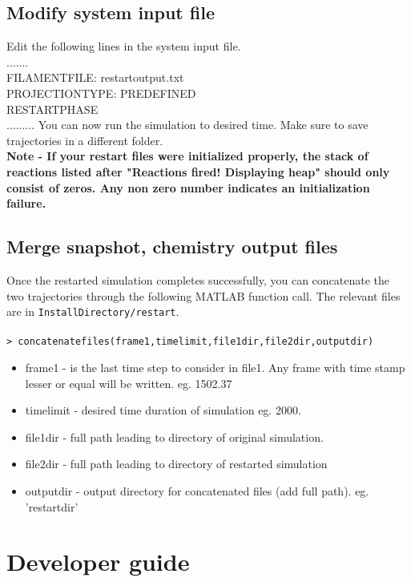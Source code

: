 \documentclass[11pt, oneside]{article}   	%
\begin{document}
\subsection{Modify system input file}
Edit the following lines in the system input file. \\ \newline
\indent .......\\
 \indent FILAMENTFILE:           restartoutput.txt \\
\indent PROJECTIONTYPE:         PREDEFINED \\
\indent RESTARTPHASE \\
\indent .........\newline \newline
You can now run the simulation to desired time. Make sure to save trajectories in a different folder.\\
\textbf{Note - If your restart files were initialized properly, the stack of reactions listed after "Reactions fired! Displaying heap" should only consist of zeros. Any non zero number indicates an initialization failure.}


\subsection{Merge snapshot, chemistry output files}
Once the restarted simulation completes successfully, you can concatenate the two trajectories through the following MATLAB function call. The relevant files are in \texttt{InstallDirectory/restart}.  \\ \\
\noindent \texttt{> concatenatefiles(frame1,time\textunderscore limit,file1dir,file2dir,outputdir)}\\
\begin{itemize}
\item frame1 - is the last time step to consider in file1. Any frame with time stamp lesser or equal will be written. eg. 1502.37
\item time\textunderscore limit - desired time duration of simulation eg. 2000.
\item file1dir - full path leading to directory of original simulation.
\item file2dir - full path leading to directory of restarted simulation
\item outputdir - output directory for concatenated files (add full path). eg. 'restartdir'
\end{itemize}
\section{Developer guide}
\end{document}
